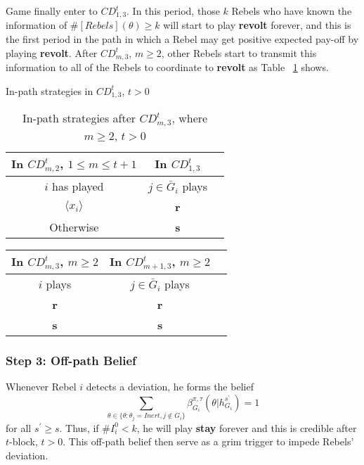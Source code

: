 \documentclass[12pt,letter]{article}
\theoremstyle{definition}
\theoremstyle{remark}
\theoremstyle{claim}
\begin{document}
Game finally enter to $CD^t_{1,3}$. In this period, those $k$ Rebels who have known the information of $\#[Rebels](\theta)\geq k$ will start to play \textbf{revolt} forever, and this is the first period in the path in which a Rebel may get positive expected pay-off by playing \textbf{revolt}. After $CD^t_{m,3}$, $m\geq 2$, other Rebels start to transmit this information to all of the Rebels to coordinate to \textbf{revolt} as Table ~\ref{Table_stg_cdm3} shows.

\begin{table}[ht]
\caption{In-path strategies in $CD^t_{1,3}$, $t>0$}
\label{Table_stg_cd13}
\begin{center}
\begin{tabular}{c c c}
In $CD^t_{m,2}$, $1\leq m\leq t+1$ 	 	&  	In $CD^t_{1,3}$		& 	\\
\hline
\hline
$i$ has played 		  							&  $j\in \bar{G}_{i}$ plays  								& \\
\hline
$\langle x_i \rangle$ 	& 	\textbf{r}	    &  \\
Otherwise		&  \textbf{s}	&  \\

\end{tabular}
\caption{In-path strategies after $CD^t_{m,3}$, where $m\geq 2$, $t>0$}
\label{Table_stg_cdm3}
\end{center}
\end{table}

\begin{table}[ht]
\begin{center}
\begin{tabular}{c c c}
In $CD^t_{m,3}$, $m\geq 2$ 	 	&  	In $CD^t_{m+1,3}$, $m\geq 2$		& 	\\
\hline
\hline
$i$ plays 		  							&  $j\in \bar{G}_{i}$ plays  								& \\
\hline
\textbf{r} 	& 	\textbf{r}	    &  \\
\textbf{s}		&  \textbf{s}	&  \\

\end{tabular}
\end{center}
\end{table}



\subsubsection{Step 3: Off-path Belief}

Whenever Rebel $i$ detects a deviation, he forms the belief 
\begin{equation}
\label{eq_grim_trigger}
\sum_{\theta \in \{\theta:\theta_j=Inert,j\notin G_i\}}\beta^{\pi,\tau}_{G_i}({\theta}|h^{s^{'}}_{G_i})=1
\end{equation}
for all $s^{'}\geq s$. Thus, if $\# I^0_i<k$, he will play \textbf{stay} forever and this is credible after $t$-block, $t>0$. This off-path belief then serve as a grim trigger to impede Rebels' deviation. 
\end{document}
